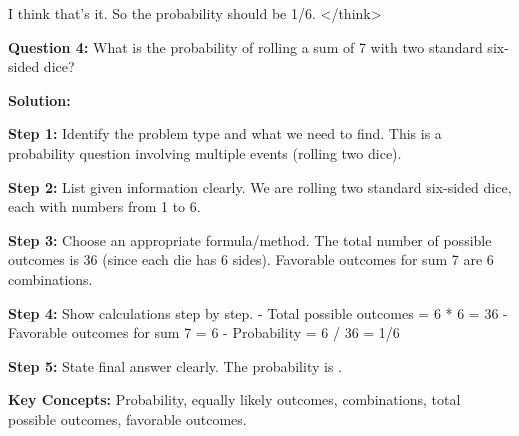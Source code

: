 I think that's it. So the probability should be 1/6.
</think>

\textbf{Question 4:} What is the probability of rolling a sum of 7 with two standard six-sided dice?

\textbf{Solution:}

\textbf{Step 1:} Identify the problem type and what we need to find. This is a probability question involving multiple events (rolling two dice).

\textbf{Step 2:} List given information clearly. We are rolling two standard six-sided dice, each with numbers from 1 to 6.

\textbf{Step 3:} Choose an appropriate formula/method. The total number of possible outcomes is 36 (since each die has 6 sides). Favorable outcomes for sum 7 are 6 combinations.

\textbf{Step 4:} Show calculations step by step.
- Total possible outcomes = 6 * 6 = 36
- Favorable outcomes for sum 7 = 6
- Probability = 6 / 36 = 1/6

\textbf{Step 5:} State final answer clearly. The probability is .

\textbf{Key Concepts:} Probability, equally likely outcomes, combinations, total possible outcomes, favorable outcomes.